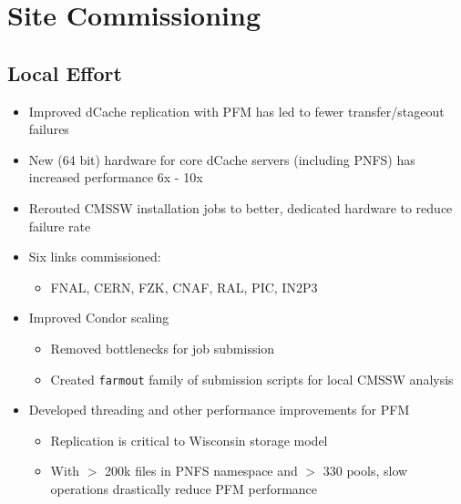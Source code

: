 \documentclass{beamer}
\begin{document}
\section{Site Commissioning}
\subsection{Local Effort}
\begin{frame}
\begin{itemize}
    \item Improved dCache replication with PFM has led to fewer transfer/stageout failures
    \item New (64 bit) hardware for core dCache servers (including PNFS) has increased performance 6x - 10x
    \item Rerouted CMSSW installation jobs to better, dedicated hardware to reduce failure rate
    \item Six links commissioned:
    \begin{itemize}
        \item FNAL, CERN, FZK, CNAF, RAL, PIC, IN2P3
    \end{itemize}
    \item Improved Condor scaling
    \begin{itemize}
        \item Removed bottlenecks for job submission
        \item Created {\tt farmout} family of submission scripts for local CMSSW analysis
    \end{itemize}
    \item Developed threading and other performance improvements for PFM
    \begin{itemize}
        \item Replication is critical to Wisconsin storage model
        \item With $>$ 200k files in PNFS namespace and $>$ 330 pools, slow operations drastically reduce PFM performance
    \end{itemize}
\end{itemize}
\end{frame}
\end{document}
